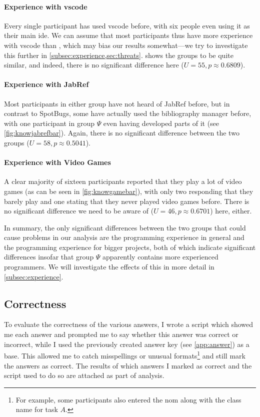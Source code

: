 \documentclass[../thesis]{subfiles}
\begin{document}
\paragraph{Experience with \gls{vscode}}
Every single participant has used \gls{vscode} before, with six people even using it as their main \gls{ide}.
We can assume that most participants thus have more experience with \gls{vscode} than \SEE{}, which may bias our results somewhat---we try to investigate this further in \cref{subsec:experience,sec:threats}.
 shows the groups to be quite similar, and indeed, there is no significant difference here ($U = 55, p \approx 0.6809$).

\paragraph{Experience with JabRef}
Most participants in either group have not heard of JabRef before, but in contrast to SpotBugs, some have actually used the bibliography manager before, with one participant in group $\Psi$ even having developed parts of it (see \cref{fig:knowjabrefbar}).
Again, there is no significant difference between the two groups ($U = 58, p \approx 0.5041$).

\paragraph{Experience with Video Games}
A clear majority of sixteen participants reported that they play a lot of video games (as can be seen in \cref{fig:knowgamebar}), with only two responding that they barely play and one stating that they never played video games before.
There is no significant difference we need to be aware of ($U = 46, p \approx 0.6701$) here, either.

In summary, the only significant differences between the two groups that could cause problems in our analysis are the programming experience in general and the programming experience for bigger projects, both of which indicate significant differences insofar that group $\Psi$ apparently contains more experienced programmers.
We will investigate the effects of this in more detail in \cref{subsec:experience}.

\subsection{Correctness}\label{subsec:correct}
To evaluate the correctness of the various answers, I wrote a script which showed me each answer and prompted me to say whether this answer was correct or incorrect, while I used the previously created answer key (see \cref{app:answer}) as a base.
This allowed me to catch misspellings or unusual formats\footnote{For example, some participants also entered the \gls{nom} along with the class name for task $A$.} and still mark the answers as correct.
The results of which answers I marked as correct and the script used to do so are attached as part of \gls{analysis}.
\end{document}

